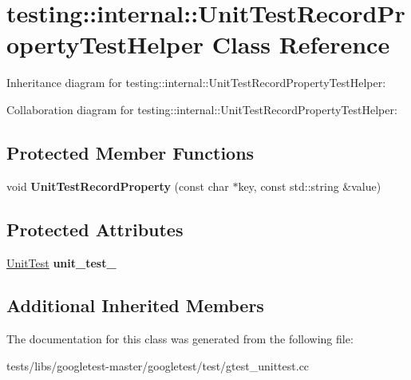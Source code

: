 \hypertarget{classtesting_1_1internal_1_1UnitTestRecordPropertyTestHelper}{}\section{testing\+:\+:internal\+:\+:Unit\+Test\+Record\+Property\+Test\+Helper Class Reference}
\label{classtesting_1_1internal_1_1UnitTestRecordPropertyTestHelper}


Inheritance diagram for testing\+:\+:internal\+:\+:Unit\+Test\+Record\+Property\+Test\+Helper\+:


Collaboration diagram for testing\+:\+:internal\+:\+:Unit\+Test\+Record\+Property\+Test\+Helper\+:
\subsection*{Protected Member Functions}
\begin{DoxyCompactItemize}
\item 
\mbox{\label{classtesting_1_1internal_1_1UnitTestRecordPropertyTestHelper_a9c5432d080faf13a1db6baff0a2944f4}} 
void {\bfseries Unit\+Test\+Record\+Property} (const char $\ast$key, const std\+::string \&value)
\end{DoxyCompactItemize}
\subsection*{Protected Attributes}
\begin{DoxyCompactItemize}
\item 
\mbox{\label{classtesting_1_1internal_1_1UnitTestRecordPropertyTestHelper_a415e13a354d3b8bd97db96aae5ef5df1}} 
\hyperlink{classtesting_1_1UnitTest}{Unit\+Test} {\bfseries unit\+\_\+test\+\_\+}
\end{DoxyCompactItemize}
\subsection*{Additional Inherited Members}


The documentation for this class was generated from the following file\+:\begin{DoxyCompactItemize}
\item 
tests/libs/googletest-\/master/googletest/test/gtest\+\_\+unittest.\+cc\end{DoxyCompactItemize}
